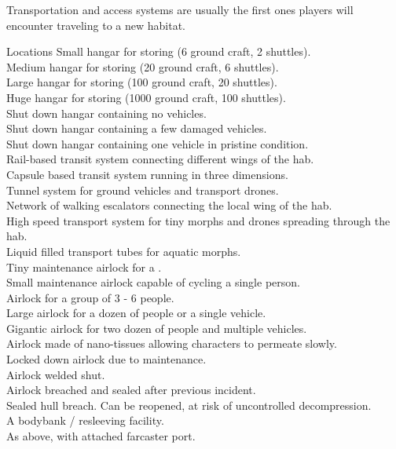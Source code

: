 \documentclass[a4]{article}
\begin{document}
Transportation and access systems are usually the first ones players will encounter
traveling to a new habitat.



\begin{tableone}{Locations}
Small hangar for storing (6 ground craft, 2 shuttles).\\
Medium hangar for storing (20 ground craft, 6 shuttles).\\
Large hangar for storing (100 ground craft, 20 shuttles).\\
Huge hangar for storing (1000 ground craft, 100 shuttles).\\
Shut down hangar containing no vehicles.\\
Shut down hangar containing a few damaged vehicles.\\
Shut down hangar containing one vehicle in pristine condition.\\
Rail-based transit system connecting different wings of the hab.\\
Capsule based transit system running in three dimensions.\\
Tunnel system for ground vehicles and transport drones.\\
Network of walking escalators connecting the local wing of the hab.\\
High speed transport system for tiny morphs and drones spreading through the hab.\\
Liquid filled transport tubes for aquatic morphs.\\
Tiny maintenance airlock for a .\\
Small maintenance airlock capable of cycling a single person.\\
Airlock for a group of 3 - 6 people.\\
Large airlock for a dozen of people or a single vehicle.\\
Gigantic airlock for two dozen of people and multiple vehicles.\\
Airlock made of nano-tissues allowing characters to permeate slowly.\\
Locked down airlock due to maintenance.\\
Airlock welded shut.\\
Airlock breached and sealed after previous incident.\\
Sealed hull breach. Can be reopened, at risk of uncontrolled decompression.\\
A bodybank / resleeving facility.\\
As above, with attached farcaster port.\\
\end{tableone}
\end{document}
